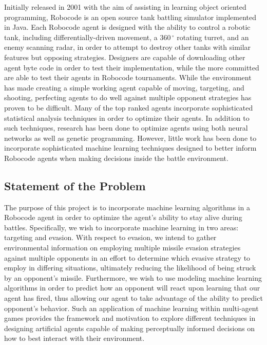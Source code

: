 \documentclass{article}
\theoremstyle{plain}
\theoremstyle{definition}
\theoremstyle{remark}
\begin{document}
Initially released in 2001 with the aim of assisting in learning object oriented programming, Robocode is an open source tank battling simulator implemented in Java. Each Robocode agent is designed with the ability to control a robotic tank, including differentially-driven movement, a $360\,^{\circ}\mathrm{}$ rotating turret, and an enemy scanning radar, in order to attempt to destroy other tanks with similar features but opposing strategies. Designers are capable of downloading other agent byte code in order to test their implementation, while the more committed are able to test their agents in Robocode tournaments. While the environment has made creating a simple working agent capable of moving, targeting, and shooting, perfecting agents to do well against multiple opponent strategies has proven to be difficult. Many of the top ranked agents incorporate sophisticated statistical analysis techniques in order to optimize their agents. In addition to such techniques, research has been done to optimize agents using both neural networks as well as genetic programming. However, little work has been done to incorporate sophisticated machine learning techniques designed to better inform Robocode agents when making decisions inside the battle environment.

\subsection*{Statement of the Problem}

The purpose of this project is to incorporate machine learning algorithms in a Robocode agent in order to optimize the agent's ability to stay alive during battles. Specifically, we wish to incorporate machine learning in two areas: targeting and evasion. With respect to evasion, we intend to gather environmental information on employing multiple missile evasion strategies against multiple opponents in an effort to determine which evasive strategy to employ in differing situations, ultimately reducing the likelihood of being struck by an opponent's missile.  Furthermore, we wish to use modeling machine learning algorithms in order to predict how an opponent will react upon learning that our agent has fired, thus allowing our agent to take advantage of the ability to predict opponent's behavior. Such an application of machine learning within multi-agent games provides the framework and motivation to explore different techniques in designing artificial agents capable of making perceptually informed decisions on how to best interact with their environment. 
\end{document}
